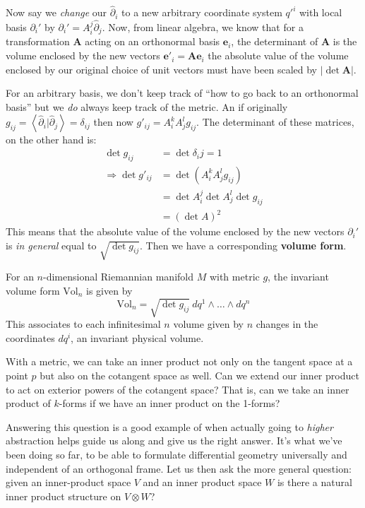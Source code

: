 \documentclass[../master.tex]{subfiles}
\begin{document}
	Now say we \emph{change} our $\hat \partial_i$ to a new arbitrary coordinate system $q'^i$ with local basis $\partial_i'$ by $\partial_i'=A^j_i \hat \partial_j$. Now, from linear algebra, we know that for a transformation $\mathbf A$ acting on an orthonormal basis $\mathbf e_i$, the determinant of $\mathbf A$ is the volume enclosed by the new vectors $\mathbf e'_i = \mathbf A \mathbf e_i$ the absolute value of the volume enclosed by our original choice of unit vectors must have been scaled by $|\det \mathbf A|$.
	
	For an arbitrary basis, we don't keep track of ``how to go back to an orthonormal basis'' but we \emph{do} always keep track of the metric. An if originally $g_{ij} = \left< \hat \partial_i| \hat \partial_j \right> = \delta_{ij}$ then now $g'_{ij} = A^{k}_i A^{l}_j g_{ij}$. The determinant of these matrices, on the other hand is:
	\begin{align*}
		\det g_{ij} &= \det \delta_ij =1\\
		 \Rightarrow \det g'_{ij} &= \det(A^{k}_i A^{l}_j g_{ij})\\
		 & = \det A^j_i \det A^l_j \det g_{ij} \\
		 & = (\det A)^2
	\end{align*}
	This means that the absolute value of the volume enclosed by the new vectors $\partial_i'$ is \emph{in general} equal to $\sqrt{\det g_{ij}}$. Then we have a corresponding \textbf{volume form}.
	\begin{defn}
		For an $n$-dimensional Riemannian manifold $M$ with metric $g$, the invariant volume form $\mathrm{Vol}_n$ is given by
		\begin{equation}
			\mathrm{Vol}_n = \sqrt{\det g_{ij}} ~ dq^1 \wedge \dots \wedge dq^n
		\end{equation}
		This associates to each infinitesimal $n$ volume given by $n$ changes in the coordinates $dq^i$, an invariant physical volume.
	\end{defn}
	
	With a metric, we can take an inner product not only on the tangent space at a point $p$ but also on the cotangent space as well. Can we extend our inner product to act on exterior powers of the cotangent space? That is, can we take an inner product of $k$-forms if we have an inner product on the 1-forms?
	
	Answering this question is a good example of when actually going to \emph{higher} abstraction helps guide us along and give us the right answer. It's what we've been doing so far, to be able to formulate differential geometry universally and independent of an orthogonal frame. Let us then ask the more general question: given an inner-product space $V$ and an inner product space $W$ is there a natural inner product structure on $V \otimes W$?
	
\end{document}

